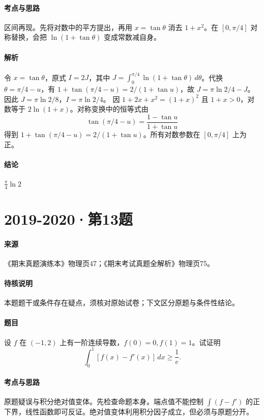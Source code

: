 \documentclass[UTF8,fontset=fandol,12pt,oneside,openany]{ctexrep}
\theoremstyle{definition}
\begin{document}
\paragraph{考点与思路}
区间再现。先将对数中的平方提出，再用 $x=\tan\theta$ 消去 $1+x^2$。在 $[0,\pi/4]$ 对称替换，会把 $\ln(1+\tan\theta)$ 变成常数减自身。
\paragraph{解析}
令 $x=\tan\theta$，原式 $I=2J$，其中 $J=\int_0^{\pi/4}\ln(1+\tan\theta)\,d\theta$。代换 $\theta=\pi/4-u$，有 $1+\tan(\pi/4-u)=2/(1+\tan u)$，故 $J=\pi\ln2/4-J$。因此 $J=\pi\ln2/8$，$I=\pi\ln2/4$。
因 $1+2x+x^2=(1+x)^2$ 且 $1+x>0$，对数等于 $2\ln(1+x)$。对称变换中的恒等式由
\[
\tan(\pi/4-u)=\frac{1-\tan u}{1+\tan u}
\]
得到 $1+\tan(\pi/4-u)=2/(1+\tan u)$。所有对数参数在 $[0,\pi/4]$ 上为正。
\paragraph{结论}
$\frac\pi4\ln2$

\par\addvspace{18pt}\noindent\begin{minipage}{\linewidth}
\section{2019-2020·第13题}
\label{exam:11:q19}
\paragraph{来源} 《期末真题演练本》物理页47；《期末考试真题全解析》物理页75。
\paragraph{待核说明} 本题题干或条件存在疑点，须核对原始试卷；下文区分原题与条件性结论。
\paragraph{题目}
设 $f$ 在 $(-1,2)$ 上有一阶连续导数，$f(0)=0,f(1)=1$。试证明
\[\int_0^1[f(x)-f'(x)]\,dx\ge\frac1e.\]
\end{minipage}\par
\paragraph{考点与思路}
原题疑误与积分绝对值变体。先检查命题本身。端点值不能控制 $\int(f-f')$ 的正下界，线性函数即可反证。绝对值变体利用积分因子成立，但必须与原题分开。
\end{document}
